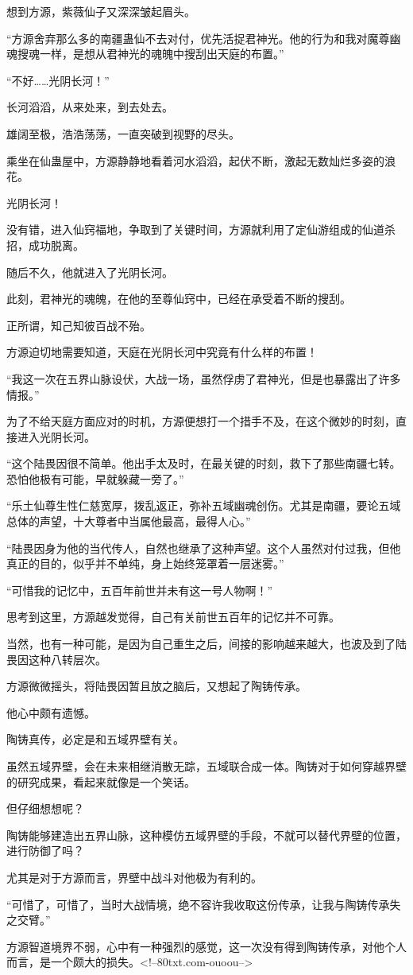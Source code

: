 \begin{this_body}
想到方源，紫薇仙子又深深皱起眉头。

“方源舍弃那么多的南疆蛊仙不去对付，优先活捉君神光。他的行为和我对魔尊幽魂搜魂一样，是想从君神光的魂魄中搜刮出天庭的布置。”

“不好……光阴长河！”

长河滔滔，从来处来，到去处去。

雄阔至极，浩浩荡荡，一直突破到视野的尽头。

乘坐在仙蛊屋中，方源静静地看着河水滔滔，起伏不断，激起无数灿烂多姿的浪花。

光阴长河！

没有错，进入仙窍福地，争取到了关键时间，方源就利用了定仙游组成的仙道杀招，成功脱离。

随后不久，他就进入了光阴长河。

此刻，君神光的魂魄，在他的至尊仙窍中，已经在承受着不断的搜刮。

正所谓，知己知彼百战不殆。

方源迫切地需要知道，天庭在光阴长河中究竟有什么样的布置！

“我这一次在五界山脉设伏，大战一场，虽然俘虏了君神光，但是也暴露出了许多情报。”

为了不给天庭方面应对的时机，方源便想打一个措手不及，在这个微妙的时刻，直接进入光阴长河。

“这个陆畏因很不简单。他出手太及时，在最关键的时刻，救下了那些南疆七转。恐怕他极有可能，早就躲藏一旁了。”

“乐土仙尊生性仁慈宽厚，拨乱返正，弥补五域幽魂创伤。尤其是南疆，要论五域总体的声望，十大尊者中当属他最高，最得人心。”

“陆畏因身为他的当代传人，自然也继承了这种声望。这个人虽然对付过我，但他真正的目的，似乎并不单纯，身上始终笼罩着一层迷雾。”

“可惜我的记忆中，五百年前世并未有这一号人物啊！”

思考到这里，方源越发觉得，自己有关前世五百年的记忆并不可靠。

当然，也有一种可能，是因为自己重生之后，间接的影响越来越大，也波及到了陆畏因这种八转层次。

方源微微摇头，将陆畏因暂且放之脑后，又想起了陶铸传承。

他心中颇有遗憾。

陶铸真传，必定是和五域界壁有关。

虽然五域界壁，会在未来相继消散无踪，五域联合成一体。陶铸对于如何穿越界壁的研究成果，看起来就像是一个笑话。

但仔细想想呢？

陶铸能够建造出五界山脉，这种模仿五域界壁的手段，不就可以替代界壁的位置，进行防御了吗？

尤其是对于方源而言，界壁中战斗对他极为有利的。

“可惜了，可惜了，当时大战情境，绝不容许我收取这份传承，让我与陶铸传承失之交臂。”

方源智道境界不弱，心中有一种强烈的感觉，这一次没有得到陶铸传承，对他个人而言，是一个颇大的损失。<!--80txt.com-ouoou-->

\end{this_body}

